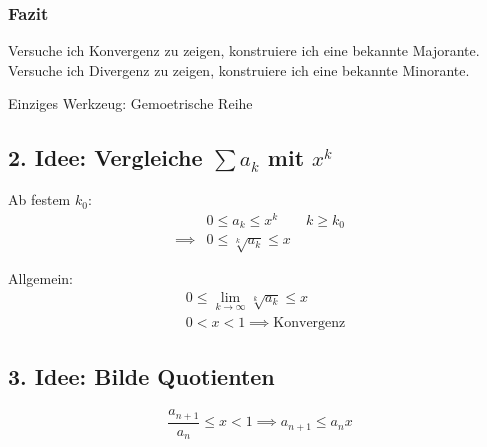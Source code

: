 \subsubsection{Fazit}
Versuche ich Konvergenz zu zeigen, konstruiere ich eine bekannte Majorante.\newline
Versuche ich Divergenz zu zeigen, konstruiere ich eine bekannte Minorante. \newline

\noindent Einziges Werkzeug: Gemoetrische Reihe

\subsection{2. Idee: Vergleiche $ \sum a_k $ mit $x^k$}
Ab festem \( k_0 \):
\begin{align*}
	&0 \leq a_k \leq x^k \qquad k \geq k_0 \\
	\implies &0 \leq \sqrt[k]{a_k} \leq x
\end{align*}

\noindent Allgemein:
\begin{align*}
	&0 \leq \lim_{k\rightarrow\infty} \sqrt[k]{a_k} \leq x \\
	&0 < x < 1 \implies \text{Konvergenz}
\end{align*}

\subsection{3. Idee: Bilde Quotienten} %
\label{sub:3_idee}

\[
	\frac{a_{n+1}}{a_n} \leq x < 1 \implies a_{n+1} \leq a_n x
\]

